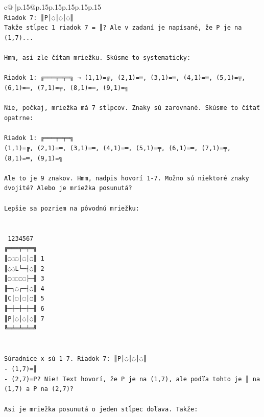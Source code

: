 \documentclass{article}
\begin{document}
{\begin{supertabular}{c@{$\;$}|p{.15\linewidth}@{}p{.15\linewidth}p{.15\linewidth}p{.15\linewidth}p{.15\linewidth}p{.15\linewidth}}
{{{\\ 
\texttt{Riadok 7: ║P│◌│◌│◌║} \\
\texttt{Takže stĺpec 1 riadok 7 = ║? Ale v zadaní je napísané, že P je na (1,7)... } \\
\\ 
\texttt{Hmm, asi zle čítam mriežku. Skúsme to systematicky:} \\
\\ 
\texttt{Riadok 1: ╔═══╤═╤═╗ → (1,1)=╔, (2,1)=═, (3,1)=═, (4,1)=═, (5,1)=╤, (6,1)=═, (7,1)=╤, (8,1)=═, (9,1)=╗} \\
\\ 
\texttt{Nie, počkaj, mriežka má 7 stĺpcov. Znaky sú zarovnané. Skúsme to čítať opatrne:} \\
\\ 
\texttt{Riadok 1: ╔═══╤═╤═╗} \\
\texttt{(1,1)=╔, (2,1)=═, (3,1)=═, (4,1)=═, (5,1)=╤, (6,1)=═, (7,1)=╤, (8,1)=═, (9,1)=╗} \\
\\ 
\texttt{Ale to je 9 znakov. Hmm, nadpis hovorí 1{-}7. Možno sú niektoré znaky dvojité? Alebo je mriežka posunutá?} \\
\\ 
\texttt{Lepšie sa pozriem na pôvodnú mriežku:} \\
\\ 
\\ 
\texttt{ 1234567} \\
\texttt{╔═══╤═╤═╗} \\
\texttt{║◌◌◌│◌│◌║ 1} \\
\texttt{║◌◌L└─┤◌║ 2} \\
\texttt{║◌◌◌◌◌├─╢ 3} \\
\texttt{╟─┐◌┌─┤◌║ 4} \\
\texttt{║C│◌│◌│◌║ 5} \\
\texttt{╟─┼─┼─┼─╢ 6} \\
\texttt{║P│◌│◌│◌║ 7} \\
\texttt{╚═╧═╧═╧═╝} \\
\\ 
\\ 
\texttt{Súradnice x sú 1{-}7. Riadok 7: ║P│◌│◌│◌║} \\
\texttt{{-} (1,7)=║} \\
\texttt{{-} (2,7)=P? Nie! Text hovorí, že P je na (1,7), ale podľa tohto je ║ na (1,7) a P na (2,7)?} \\
\\ 
\texttt{Asi je mriežka posunutá o jeden stĺpec doľava. Takže:} \\
}}}
\end{supertabular}}
\end{document}
